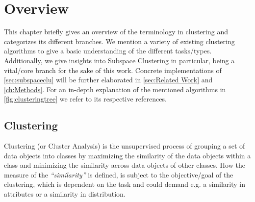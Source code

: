 \chapter{Overview}

This chapter briefly gives an overview of the terminology in clustering and categorizes its different branches. We mention a variety of existing clustering algorithms to give a basic understanding of the different tasks/types. Additionally, we give insights into Subspace Clustering in particular, being a vital/core branch for the sake of this work. Concrete implementations of \autoref{sec:subspaceclu} will be further elaborated in \autoref{sec:Related Work} and \autoref{ch:Methods}. For an in-depth explanation of the mentioned algorithms in \autoref{fig:clusteringtree} we refer to its respective references.

\section{Clustering}\label{sec:clu}
Clustering (or Cluster Analysis) is the unsupervised process of grouping a set of data objects into classes by maximizing the similarity of the data objects within a class and minimizing the similarity across data objects of other classes. How the measure of the \textit{``similarity''} is defined, is subject to the objective/goal of the clustering, which is dependent on the task and could demand e.g. a similarity in attributes or a similarity in distribution. 

